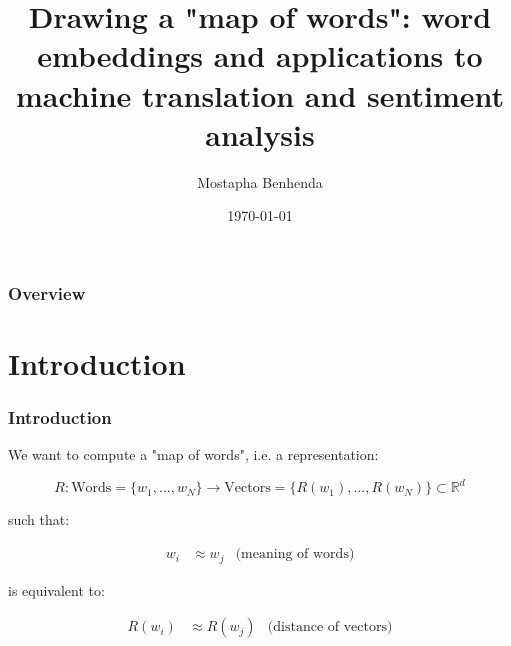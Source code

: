 \documentclass{beamer}
\title[word embeddings]{Drawing a "map of words": word embeddings and applications to machine translation and sentiment analysis} %
\author{Mostapha Benhenda} %
\institute[] %
{
Artificial Intelligence Club, Kyiv \\ %
\medskip
\textit{mostaphabenhenda@gmail.com} %
}
\date{\today} %
\begin{document}
\begin{frame}
\titlepage %
\end{frame}

\begin{frame}
\frametitle{Overview} %
\tableofcontents %
\end{frame}


\section{Introduction} %


\begin{frame}
\frametitle{Introduction}

We want to compute a "map of words", i.e. a representation: 

\[ R: \mbox{Words}= \{ w_1,...,w_N \} \rightarrow  \mbox{Vectors} = \{ R(w_1),..., R(w_N) \} \subset \mathbb{R}^d \]
 
 such that:
 
\begin{align*}
   w_i  &\approx w_j & \text{(meaning of words)}
\end{align*} 
 
is equivalent to:

\begin{align*}
  R( w_i)  &\approx R(w_j) & \text{(distance of vectors)}
\end{align*} 
 


\end{frame}
\end{document}
